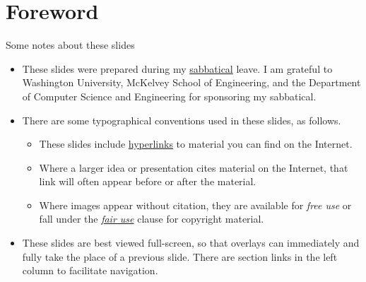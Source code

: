 
\section{Foreword}


\begin{frame}{Some notes about these slides}
\begin{itemize}[<+->]
    \item These slides were prepared during my \href{https://en.wikipedia.org/wiki/Sabbatical}{sabbatical} leave.  I am grateful to Washington University, McKelvey School of Engineering, and the Department of Computer Science and Engineering for sponsoring my sabbatical.
    \item There are some typographical conventions used in these slides, as follows.
    \begin{itemize}
        \item These slides include \href{https://en.wikipedia.org/wiki/Hyperlink}{hyperlinks} to material you can find on the Internet.
        \item Where a larger idea or presentation cites material on the Internet, that link will often appear before or after the material. 
        \item Where images appear without citation, they are available for \emph{free use} or fall under the \href{https://en.wikipedia.org/wiki/Fair_use}{\emph{fair use}} clause for copyright material. 
    \end{itemize}
    \item These slides are best viewed full-screen, so that overlays can immediately and fully take the place of a previous slide.  There are section links in the left column to facilitate navigation.
\end{itemize}
\end{frame}

